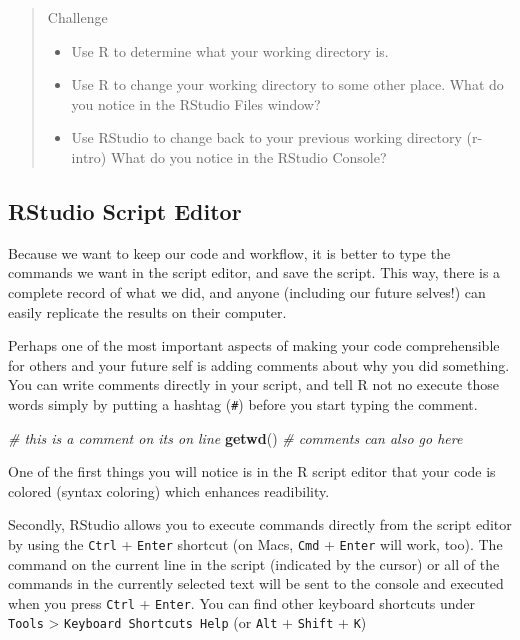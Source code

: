 \documentclass[
]{book}
\newenvironment{Shaded}{\begin{snugshade}}{\end{snugshade}}
\newcommand{\CommentTok}[1]{\textcolor[rgb]{0.56,0.35,0.01}{\textit{#1}}}
\newcommand{\FunctionTok}[1]{\textcolor[rgb]{0.13,0.29,0.53}{\textbf{#1}}}
\newcommand{\NormalTok}[1]{#1}
\providecommand{\tightlist}{%
  \setlength{\itemsep}{0pt}\setlength{\parskip}{0pt}}
\begin{document}
\begin{quote}
Challenge

\begin{itemize}
\tightlist
\item
  Use R to determine what your working directory is.
\item
  Use R to change your working directory to some other place. What do you notice in the RStudio Files window?
\item
  Use RStudio to change back to your previous working directory (r-intro) What do you notice in the RStudio Console?
\end{itemize}
\end{quote}

\hypertarget{rstudio-script-editor}{%
\subsection{RStudio Script Editor}\label{rstudio-script-editor}}

Because we want to keep our code and workflow, it is better to type
the commands we want in the script editor, and save the script. This way, there
is a complete record of what we did, and anyone (including our future selves!)
can easily replicate the results on their computer.

Perhaps one of the most important aspects of making your code comprehensible for others and your future self is adding comments about why you did something. You can write comments directly in your script, and tell R not no execute those words simply by putting a hashtag (\texttt{\#}) before you start typing the comment.

\begin{Shaded}
\begin{Highlighting}[]
\CommentTok{\# this is a comment on its on line}
\FunctionTok{getwd}\NormalTok{() }\CommentTok{\# comments can also go here}
\end{Highlighting}
\end{Shaded}

One of the first things you will notice is in the R script editor that your code is colored (syntax coloring) which enhances readibility.

Secondly, RStudio allows you to execute commands directly from the script editor by using
the \texttt{Ctrl} + \texttt{Enter} shortcut (on Macs, \texttt{Cmd} +
\texttt{Enter} will work, too). The command on the current line in the
script (indicated by the cursor) or all of the commands in the currently
selected text will be sent to the console and executed when you press
\texttt{Ctrl} + \texttt{Enter}. You can find other keyboard shortcuts under \texttt{Tools} \textgreater{} \texttt{Keyboard\ Shortcuts\ Help} (or \texttt{Alt} + \texttt{Shift} + \texttt{K})
\end{document}
